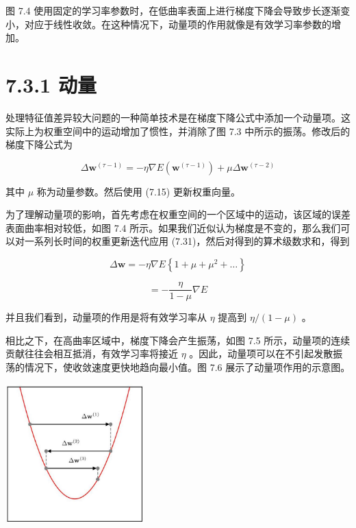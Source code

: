 \documentclass[10pt]{article}
\begin{document}
图 7.4 使用固定的学习率参数时，在低曲率表面上进行梯度下降会导致步长逐渐变小，对应于线性收敛。在这种情况下，动量项的作用就像是有效学习率参数的增加。

\section*{7.3.1 动量}

处理特征值差异较大问题的一种简单技术是在梯度下降公式中添加一个动量项。这实际上为权重空间中的运动增加了惯性，并消除了图 7.3 中所示的振荡。修改后的梯度下降公式为

\[
\Delta {\mathbf{w}}^{\left( \tau  - 1\right) } =  - \eta \nabla E\left( {\mathbf{w}}^{\left( \tau  - 1\right) }\right)  + {\mu \Delta }{\mathbf{w}}^{\left( \tau  - 2\right) } \tag{7.31}
\]

其中 \(\mu\) 称为动量参数。然后使用 (7.15) 更新权重向量。

为了理解动量项的影响，首先考虑在权重空间的一个区域中的运动，该区域的误差表面曲率相对较低，如图 7.4 所示。如果我们近似认为梯度是不变的，那么我们可以对一系列长时间的权重更新迭代应用 (7.31)，然后对得到的算术级数求和，得到

\[
\Delta \mathbf{w} =  - \eta \nabla E\left\{  {1 + \mu  + {\mu }^{2} + \ldots }\right\}   \tag{7.32}
\]

\[
=  - \frac{\eta }{1 - \mu }\nabla E \tag{7.33}
\]

并且我们看到，动量项的作用是将有效学习率从 \(\eta\) 提高到 \(\eta /\left( {1 - \mu }\right)\) 。

相比之下，在高曲率区域中，梯度下降会产生振荡，如图 7.5 所示，动量项的连续贡献往往会相互抵消，有效学习率将接近 \(\eta\) 。因此，动量项可以在不引起发散振荡的情况下，使收敛速度更快地趋向最小值。图 7.6 展示了动量项作用的示意图。

\begin{center}
\includegraphics[max width=0.4\textwidth]{images/0194e279-9b28-703a-88f4-c3ac21e2010d_240_954_347_590_592_0.jpg}
\end{center}
\hspace*{3em} 
\end{document}
